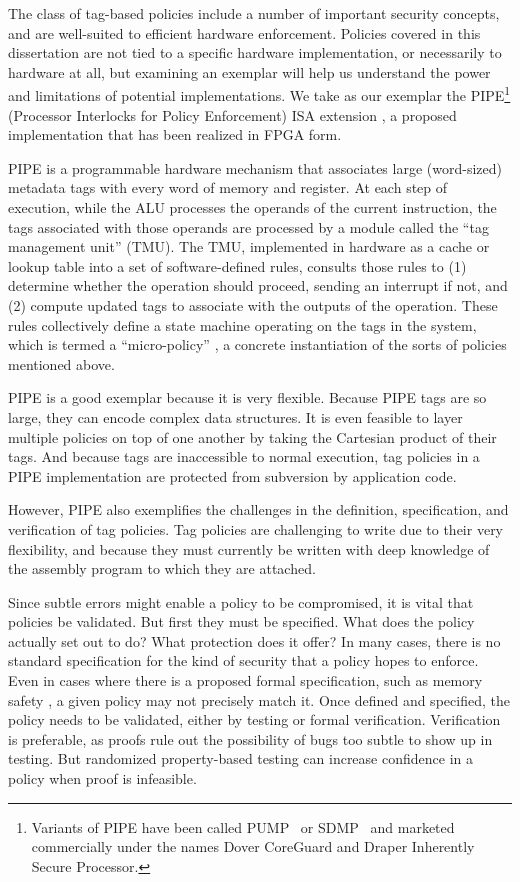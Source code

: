 \documentclass{report}
\begin{document}
The class of tag-based policies include a number of important security concepts, and are
well-suited to efficient hardware enforcement. Policies covered in this dissertation are not
tied to a specific hardware implementation, or necessarily to hardware at all, but examining
an exemplar will help us understand the power and limitations of potential implementations.
We take as our exemplar the PIPE\footnote{ Variants of PIPE have
been called PUMP~\cite{Dhawan+15} or SDMP~\cite{RoesslerD18} and marketed commercially
under the names Dover CoreGuard and Draper Inherently Secure Processor.}
(Processor Interlocks for Policy Enforcement) ISA extension \cite{Azevedo+16,Azevedo+15},
a proposed implementation that has been realized in FPGA form.

PIPE is a programmable hardware mechanism that associates large (word-sized) metadata tags
with every word of memory and register. At each step of execution, while the ALU processes
the operands of the current instruction, the tags associated with those operands are processed
by a module called the ``tag management unit'' (TMU).
The TMU, implemented in hardware as a cache or lookup table into a set of software-defined rules,
consults those rules to (1) determine whether the operation should
proceed, sending an interrupt if not, and (2) compute updated tags to associate with the
outputs of the operation. These rules collectively define a state machine operating on the
tags in the system, which is termed a ``micro-policy'' \cite{Azevedo+15}, a concrete instantiation of the
sorts of policies mentioned above.

PIPE is a good exemplar because it is very flexible. Because PIPE tags are so large,
they can encode complex data structures. It is even feasible to layer
multiple policies on top of one another by taking the Cartesian product of their tags.
And because tags are inaccessible to normal execution, tag policies in a PIPE implementation
are protected from subversion by application code.

However, PIPE also exemplifies the challenges in the definition, specification, and
verification of tag policies. Tag policies are challenging to write due to their very
flexibility, and because they must currently be written with deep knowledge of the assembly
program to which they are attached.

Since subtle errors might enable a policy to be compromised,
it is vital that policies be validated. But first they must be specified. What does the
policy actually set out to do? What protection does it offer?
In many cases, there is no standard specification for the kind of security that a policy hopes
to enforce. Even in cases where there is a proposed formal specification, such as
memory safety \cite{Azevedo+16}, a given policy may not precisely match it. 
Once defined and specified, the policy needs to be validated, either by testing or formal
verification. Verification is preferable, as proofs rule out the possibility of bugs too
subtle to show up in testing. But randomized property-based testing can increase confidence
in a policy when proof is infeasible.
\end{document}
